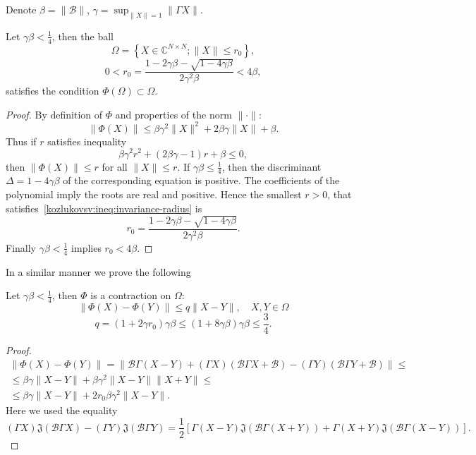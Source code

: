 Denote
\( \beta = \|\mathcal{B}\| \), \( \gamma = \sup_{\|X\|=1} \|\Gamma X\| \).

\begin{lem}
    Let \( \gamma\beta < \frac14\),
    then the ball
    \[
        \Omega = \left\{ X\in \mathbb{C}^{N{\times}N}; \|X\| \leq r_0 \right\}, \]
    \[  0 < r_0 = \frac{1 - 2\gamma\beta - \sqrt{1-4\gamma\beta}}{2\gamma^2\beta} < 4\beta, \]
    satisfies the condition \( \Phi(\Omega)\subset\Omega \).
\end{lem}
\begin{proof}
By definition of \( \Phi \) and properties of the norm \( \|\cdot\| \):
    \[ \| \Phi(X) \| \leq
     \beta \gamma^2 \|X\|^2 + 2\beta\gamma\|X\| + \beta. \]
Thus if \( r \) satisfies inequality
    \begin{equation}\label{kozlukovsv:ineq:invariance-radius}
        \beta \gamma^2 r^2 + (2\beta\gamma - 1)r + \beta \leq 0,
    \end{equation}
    then \( \|\Phi(X)\| \leq r \) for all \( \|X\| \leq r \).
If \( \gamma\beta \leq \frac14 \),
    then the discriminant \( \Delta = 1-4\gamma\beta \)
    of the corresponding equation is positive.
The coefficients of the polynomial imply the roots are real and positive.
Hence the smallest \( r>0 \),
    that satisfies~\eqref{kozlukovsv:ineq:invariance-radius} is
    \[ r_0 = \frac{1 - 2\gamma\beta - \sqrt{1-4\gamma\beta}}{2\gamma^2\beta}. \]
Finally \( \gamma\beta<\frac14 \) implies \( r_0 < 4\beta \).
\end{proof}

In a similar manner we prove the following
\begin{lem}
    Let \(\gamma\beta<\frac14\),
    then \( \Phi \) is a contraction on \( \Omega \):
    \[ \| \Phi(X) - \Phi(Y) \| \leq q \|X - Y\|, \quad X,Y\in\Omega \]
    \[ q = (1+2\gamma r_0) \gamma\beta \leq (1+8\gamma\beta)\gamma\beta \leq \frac34. \]
\end{lem}
\begin{proof}
    \begin{align*} \| \Phi(X) - \Phi(Y) \| = \| \mathcal{B}\Gamma (X-Y) + (\Gamma X)(\mathcal{B}\Gamma X + \mathcal{B})
     - (\Gamma Y)(\mathcal{B} \Gamma Y + \mathcal{B}) \| \leq \\
        \leq
     \beta\gamma\|X-Y\| +
     \beta \gamma^2 \|X-Y\| \|X+Y\| \leq \\
        \leq
     \beta\gamma\|X-Y\| +
     2 r_0 \beta \gamma^2 \|X-Y\|.
    \end{align*}
Here we used the equality
\[ (\Gamma X) \mathfrak{J}(\mathcal{B}\Gamma X) - (\Gamma Y) \mathfrak{J}(\mathcal{B}\Gamma Y) =
    \frac12\left[
        \Gamma(X-Y) \mathfrak{J}(\mathcal{B}\Gamma(X+Y))
    +   \Gamma(X+Y) \mathfrak{J}(\mathcal{B}\Gamma(X-Y))
    \right]. \]
\end{proof}

